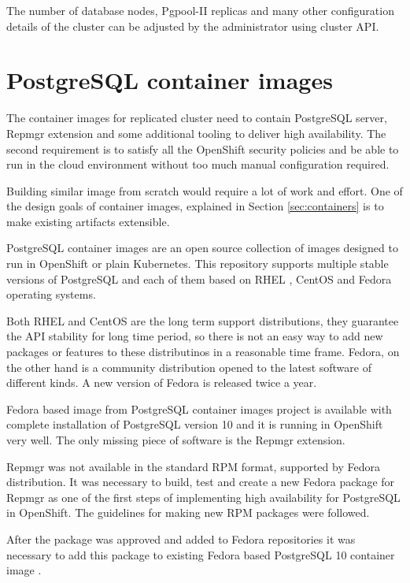 \documentclass[
  digital, %
  twoside, %
  table,   %
  lof,     %
  lot,     %
]{fithesis3}
\begin{document}
The number of database nodes, Pgpool-II replicas and many other configuration details of the cluster can be adjusted by the administrator using cluster API.

\section{PostgreSQL container images} \label{sec:pg_cnt_images}
The container images for replicated cluster need to contain PostgreSQL server, Repmgr extension and some additional tooling to deliver high availability. The second requirement is to satisfy all the OpenShift security policies and be able to run in the cloud environment without too much manual configuration required.

Building similar image from scratch would require a lot of work and effort. One of the design goals of container images, explained in Section \ref{sec:containers} is to make existing artifacts extensible.

PostgreSQL container images \cite{pg_cnt} are an open source collection of images designed to run in OpenShift or plain Kubernetes. This repository supports multiple stable versions of PostgreSQL and each of them based on RHEL \cite{rhel}, CentOS \cite{centos} and Fedora \cite{getfedora} operating systems.

Both RHEL and CentOS are the long term support distributions, they guarantee the API stability for long time period, so there is not an easy way to add new packages or features to these distributinos in a reasonable time frame. Fedora, on the other hand is a community distribution opened to the latest software of different kinds. A new version of Fedora is released twice a year.

Fedora based image from PostgreSQL container images project is available with complete installation of PostgreSQL version 10 and it is running in OpenShift very well. The only missing piece of software is the Repmgr extension.

Repmgr was not available in the standard RPM \cite{rpm} format, supported by Fedora distribution. It was necessary to build, test and create a new Fedora package for Repmgr \cite{fedora_repmgr} as one of the first steps of implementing high availability for PostgreSQL in OpenShift. The guidelines for making new RPM packages \cite{fedora_new_package} were followed.

After the package was approved and added to Fedora repositories \cite{fedora_repositories} it was necessary to add this package to existing Fedora based PostgreSQL 10 container image \cite{pg_img}.
\end{document}
